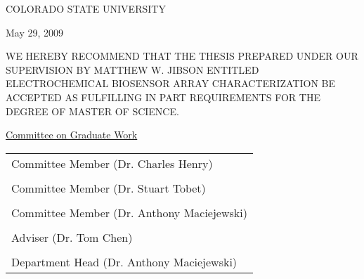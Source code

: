 \begin{center}
	COLORADO STATE UNIVERSITY
\end{center}

\vspace{0.5in}

\begin{flushright}
	May 29, 2009
\end{flushright}

WE HEREBY RECOMMEND THAT THE THESIS PREPARED UNDER OUR SUPERVISION BY MATTHEW W. JIBSON ENTITLED ELECTROCHEMICAL BIOSENSOR ARRAY CHARACTERIZATION BE ACCEPTED AS FULFILLING IN PART REQUIREMENTS FOR THE DEGREE OF MASTER OF SCIENCE.

\vspace{0.5in}

\begin{center}
	\underline{Committee on Graduate Work}\\

	\vspace{0.5in}

	\begin{tabular}{p{3in}}
		\\
		\hline Committee Member (Dr. Charles Henry)\\
		\\
		\hline Committee Member (Dr. Stuart Tobet)\\
		\\
		\hline Committee Member (Dr. Anthony Maciejewski)\\
		\\
		\hline Adviser (Dr. Tom Chen)\\
		\\
		\hline Department Head (Dr. Anthony Maciejewski)
	\end{tabular}
\end{center}
